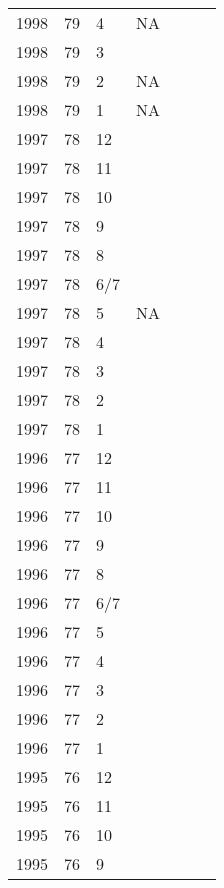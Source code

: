 \begin{longtable}{ |l|l|l|l|p{2.7cm}|l|p{2cm}| }
 1998 & 79 &     4 &     NA  &  &  & \\
 1998 & 79 &     3 &         &  &  & \\
 1998 & 79 &     2 &     NA  &  &  & \\
 1998 & 79 &     1 &     NA  &  &  & \\
 1997 & 78 &    12 &         &  &  & \\
 1997 & 78 &    11 &         &  &  & \\
 1997 & 78 &    10 &         &  &  & \\
 1997 & 78 &     9 &         &  &  & \\
 1997 & 78 &     8 &         &  &  & \\
 1997 & 78 &   6/7 &         &  &  & \\
 1997 & 78 &     5 &     NA  &  &  & \\
 1997 & 78 &     4 &         &  &  & \\
 1997 & 78 &     3 &         &  &  & \\
 1997 & 78 &     2 &         &  &  & \\
 1997 & 78 &     1 &         &                &  & \\
 1996 & 77 &    12 &         &                &  & \\
 1996 & 77 &    11 &         &                &  & \\
 1996 & 77 &    10 &         &                &  & \\
 1996 & 77 &     9 &         &                &  & \\
 1996 & 77 &     8 &         &                &  & \\
 1996 & 77 &   6/7 &         &                &  & \\
 1996 & 77 &     5 &         &                &  & \\
 1996 & 77 &     4 &         &                &  & \\
 1996 & 77 &     3 &         &                &  & \\
 1996 & 77 &     2 &         &                &  & \\
 1996 & 77 &     1 &         &                &  & \\
 1995 & 76 &    12 &         &                &  & \\
 1995 & 76 &    11 &         &                &  & \\
 1995 & 76 &    10 &         &                &  & \\
 1995 & 76 &     9 &         &                &  & \\

\end{longtable}
